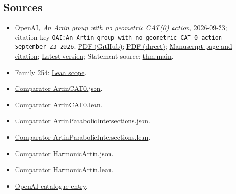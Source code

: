 \documentclass[11pt]{article}
\begin{document}
\subsection{Sources}
\begin{itemize}
\item OpenAI, \emph{An Artin group with no geometric CAT(0) action}, 2026-09-23; citation key \texttt{OAI:An-Artin-group-with-no-geometric-CAT-0-action-September-23-2026}. \href{https://github.com/openai/math/blob/adc7f1241b42e322a6451854ab7e4b4c146bf78a/preprints/An-Artin-group-with-no-geometric-CAT-0-action-September-23-2026/paper.pdf}{PDF (GitHub)}; \href{https://github.com/openai/math/raw/adc7f1241b42e322a6451854ab7e4b4c146bf78a/preprints/An-Artin-group-with-no-geometric-CAT-0-action-September-23-2026/paper.pdf}{PDF (direct)}; \href{https://github.com/openai/math/blob/adc7f1241b42e322a6451854ab7e4b4c146bf78a/preprints/An-Artin-group-with-no-geometric-CAT-0-action-September-23-2026/README.md}{Manuscript page and citation}; \href{https://github.com/openai/math/blob/main/preprints/An-Artin-group-with-no-geometric-CAT-0-action-September-23-2026/paper.pdf}{Latest version}; Statement source: \href{https://github.com/openai/math/blob/adc7f1241b42e322a6451854ab7e4b4c146bf78a/preprints/An-Artin-group-with-no-geometric-CAT-0-action-September-23-2026/build/sections/introduction.tex\#L61}{thm:main}.
\item Family 254: \href{https://github.com/openai/math/blob/adc7f1241b42e322a6451854ab7e4b4c146bf78a/lean/docs/254.md}{Lean scope}.
\item \href{https://github.com/openai/math/blob/adc7f1241b42e322a6451854ab7e4b4c146bf78a/lean/ComparatorChallenges/ArtinCAT0.json}{Comparator ArtinCAT0.json}.
\item \href{https://github.com/openai/math/blob/adc7f1241b42e322a6451854ab7e4b4c146bf78a/lean/ComparatorChallenges/ArtinCAT0.lean}{Comparator ArtinCAT0.lean}.
\item \href{https://github.com/openai/math/blob/adc7f1241b42e322a6451854ab7e4b4c146bf78a/lean/ComparatorChallenges/ArtinParabolicIntersections.json}{Comparator ArtinParabolicIntersections.json}.
\item \href{https://github.com/openai/math/blob/adc7f1241b42e322a6451854ab7e4b4c146bf78a/lean/ComparatorChallenges/ArtinParabolicIntersections.lean}{Comparator ArtinParabolicIntersections.lean}.
\item \href{https://github.com/openai/math/blob/adc7f1241b42e322a6451854ab7e4b4c146bf78a/lean/ComparatorChallenges/HarmonicArtin.json}{Comparator HarmonicArtin.json}.
\item \href{https://github.com/openai/math/blob/adc7f1241b42e322a6451854ab7e4b4c146bf78a/lean/ComparatorChallenges/HarmonicArtin.lean}{Comparator HarmonicArtin.lean}.
\item \href{https://github.com/openai/math/blob/adc7f1241b42e322a6451854ab7e4b4c146bf78a/CONTENTS.md}{OpenAI catalogue entry}.
\end{itemize}
\end{document}
